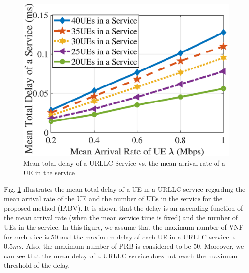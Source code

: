 \documentclass[lettersize,journal]{IEEEtran}
\begin{document}
\begin{figure}
  \centering
      \includegraphics[scale = 0.5]{fig/delay_newn.eps}
  \caption{Mean total delay of a URLLC Service vs. the mean arrival rate of a UE in the service}
  \label{fig:6}
\end{figure}
Fig. \ref{fig:6} illustrates the mean total delay of a UE in a URLLC service regarding the mean arrival rate of the UE and the number of UEs in the service for the proposed method (IABV).
It is shown that the delay is an ascending function of the mean arrival rate (when the mean service time is fixed) and the number of UEs in the service. In this figure, we assume that the maximum number of VNF for each slice is 50 and the maximum delay of each UE in a URLLC service is $0.5ms$. Also, the maximum number of PRB is considered to be 50.
 Moreover, we can see that the mean delay of a URLLC service
does not reach the maximum threshold of the delay.
\end{document}
